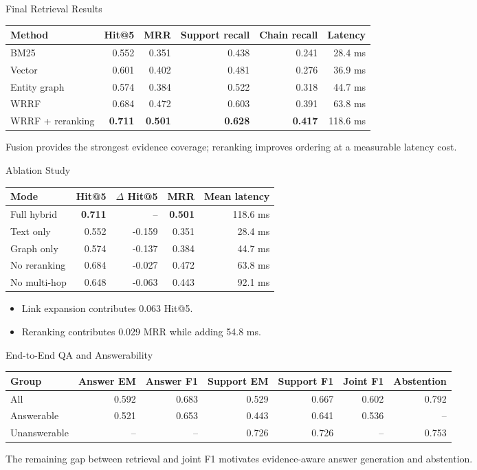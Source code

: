 \documentclass[aspectratio=169]{beamer}
\newcommand{\best}[1]{\textcolor{fptOrange}{\textbf{#1}}}
\begin{document}
\begin{frame}{Final Retrieval Results}
\scriptsize
\centering
\begin{tabular}{lrrrrr}
\toprule
Method & Hit@5 & MRR & Support recall & Chain recall & Latency \\
\midrule
BM25 & 0.552 & 0.351 & 0.438 & 0.241 & 28.4 ms \\
Vector & 0.601 & 0.402 & 0.481 & 0.276 & 36.9 ms \\
Entity graph & 0.574 & 0.384 & 0.522 & 0.318 & 44.7 ms \\
WRRF & 0.684 & 0.472 & 0.603 & 0.391 & 63.8 ms \\
WRRF + reranking & \best{0.711} & \best{0.501} & \best{0.628} & \best{0.417} & 118.6 ms \\
\bottomrule
\end{tabular}
\vspace{.45cm}
\normalsize Fusion provides the strongest evidence coverage; reranking improves ordering at a measurable latency cost.
\end{frame}

\begin{frame}{Ablation Study}
\small
\centering
\begin{tabular}{lrrrr}
\toprule
Mode & Hit@5 & $\Delta$ Hit@5 & MRR & Mean latency \\
\midrule
Full hybrid & \best{0.711} & -- & \best{0.501} & 118.6 ms \\
Text only & 0.552 & -0.159 & 0.351 & 28.4 ms \\
Graph only & 0.574 & -0.137 & 0.384 & 44.7 ms \\
No reranking & 0.684 & -0.027 & 0.472 & 63.8 ms \\
No multi-hop & 0.648 & -0.063 & 0.443 & 92.1 ms \\
\bottomrule
\end{tabular}
\vspace{.45cm}
\begin{itemize}
\item Link expansion contributes 0.063 Hit@5.
\item Reranking contributes 0.029 MRR while adding 54.8 ms.
\end{itemize}
\end{frame}

\begin{frame}{End-to-End QA and Answerability}
\small
\centering
\begin{tabular}{lrrrrrr}
\toprule
Group & Answer EM & Answer F1 & Support EM & Support F1 & Joint F1 & Abstention \\
\midrule
All & 0.592 & 0.683 & 0.529 & 0.667 & 0.602 & 0.792 \\
Answerable & 0.521 & 0.653 & 0.443 & 0.641 & 0.536 & -- \\
Unanswerable & -- & -- & 0.726 & 0.726 & -- & 0.753 \\
\bottomrule
\end{tabular}
\vspace{.4cm}
\normalsize The remaining gap between retrieval and joint F1 motivates evidence-aware answer generation and abstention.
\end{frame}
\end{document}
